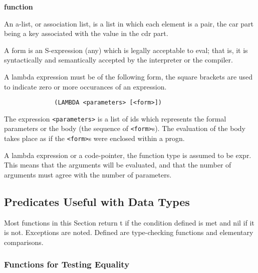\begin{Ventry}{\bf function}
\item [{\bf a-list}]        An a-list, or association list, is a list in
which
              each element is a pair, the car part being  a  key
              associated with the value in the cdr part.

\item [{\bf form}]          A  form  is an S-expression (any) which is
legally
              acceptable to eval; that is, it  is  syntactically
              and  semantically  accepted  by the interpreter or
              the compiler. 

\item [{\bf lambda}]       A lambda expression must be of the following form,
              the square brackets are used to indicate  zero  or
              more occurances of an expression.

              \begin{verbatim}
              (LAMBDA <parameters> [<form>])
              \end{verbatim}
              The expression \verb+<parameters>+ is a list of ids which
              represents  the formal parameters or the body (the
              sequence of \verb+<form>+s). The evaluation of the body
              takes place as if the \verb+<form>+s were enclosed within
              a  progn.    

\item [{\bf function}]      A  lambda  expression  or  a   code-pointer,  
the
              function  type  is assumed to be expr.  This means
              that the arguments will be evaluated, and that the
              number of arguments must agree with the number  of
              parameters.
\end{Ventry}

\subsection{Predicates Useful with Data Types}

Most  functions  in  this  Section  return  t if the condition
defined is met and nil if it is  not.    Exceptions  are  noted.
Defined are type-checking functions and elementary comparisons.

\subsubsection{Functions for Testing Equality}


